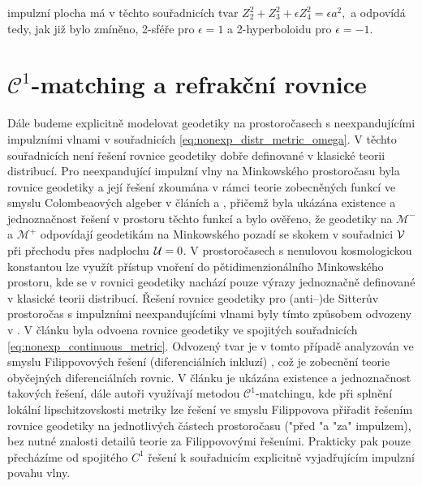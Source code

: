 impulzní plocha má v těchto souřadnicích tvar
$Z_2^2 + Z_3^2 + \epsilon Z_4^2 = \epsilon a^2,$
a odpovídá tedy, jak již bylo zmíněno, 2-sféře pro $\epsilon=1$ a 2-hyperboloidu pro $\epsilon=-1$.

\section{\texorpdfstring{$\mathcal{C}^1$}{C1}-matching a refrakční rovnice}
Dále budeme explicitně modelovat geodetiky na prostoročasech s neexpandujícími impulzními vlnami v souřadnicích
\eqref{eq:nonexp_distr_metric_omega}. V těchto souřadnicích není řešení rovnice geodetiky dobře definované v
klasické teorii distribucí. Pro neexpandující impulzní vlny na Minkowského prostoročasu byla rovnice geodetiky
a její řešení zkoumána v rámci teorie zobecněných funkcí ve smyslu Colombeaových algeber v článích \cite{Steinbauer_1998} a \cite{Kunzinger_1999},
přičemž byla ukázána existence a jednoznačnost řešení v prostoru těchto funkcí a bylo ověřeno, že geodetiky na $\mathcal{M}^-$ a $\mathcal{M}^+$ odpovídají
geodetikám na Minkowského pozadí se skokem v souřadnici $\mathcal{V}$ při přechodu přes nadplochu $\mathcal{U}=0$. V prostoročasech s
nenulovou kosmologickou konstantou lze využít přístup vnoření do pětidimenzionálního Minkowského prostoru, kde se v rovnici
geodetiky nachází pouze výrazy jednoznačně definované v klasické teorii distribucí. Řešení rovnice geodetiky
pro (anti--)de Sitterův prostoročas s impulzními neexpandujícími vlnami byly tímto způsobem odvozeny v \cite{Podolsk__2001}.
V článku \cite{Podolsky:2014ysa} byla odvoena rovnice geodetiky ve spojitých souřadnicích \eqref{eq:nonexp_continuous_metric}.
Odvozený tvar je v tomto případě analyzován ve smyslu Filippovových řešení (diferenciálních inkluzí) \cite{filippov1988differential}, což je zobecnění teorie obyčejných diferenciálních rovnic.
V článku je ukázána existence a jednoznačnost takových řešení, dále autoři využívají metodou $\mathcal{C}^1$-matchingu,
kde při splnění lokální lipschitzovskosti metriky lze řešení ve smyslu Filippovova přiřadit řešením rovnice geodetiky na jednotlivých částech prostoročasu
("před "a "za" impulzem), bez nutné znalosti detailů teorie za Filippovovými řešeními. Prakticky pak pouze přecházíme od
spojitého $C^1$ řešení k souřadnicím explicitně vyjadřujícím impulzní povahu vlny.


